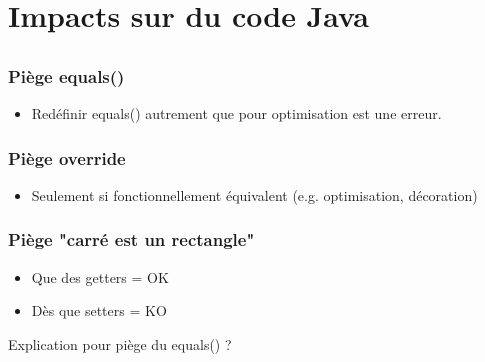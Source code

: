\documentclass[draft]{beamer}
\begin{document}
\section{Impacts sur du code Java}
\subsection{}

\begin{frame}
\frametitle{Piège equals()}
\begin{itemize}
 \item Redéfinir equals() autrement que pour optimisation est une erreur.
\end{itemize}
\end{frame}

\begin{frame}
\frametitle{Piège override}
\begin{itemize}
 \item Seulement si fonctionnellement équivalent (e.g. optimisation, décoration)
\end{itemize}
\end{frame}

\begin{frame}
\frametitle{Piège "carré est un rectangle"}
\begin{itemize}
 \item Que des getters = OK
 \item Dès que setters = KO
\end{itemize}
Explication pour piège du equals() ?
\end{frame}
\end{document}
